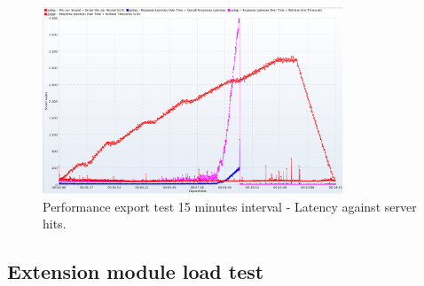 \begin{figure}[htp]
    \centering
    \includegraphics[width=0.8\textwidth]{results/obs/export/obs_export_15m_res_latencies_against_hits.png}
    \caption{Performance export test 15 minutes interval - Latency against server hits.}
    \label{fi:test_obs_export_15m_latency}
\end{figure}



\subsection{Extension module load test}
\label{subse:obs_test_plan_extension_15min}
